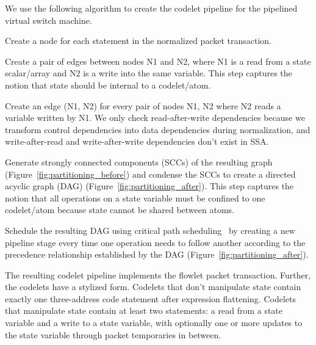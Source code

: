 We use the following algorithm to create the codelet pipeline for the pipelined
virtual switch machine.
\begin{CompactEnumerate}
  \item Create a node for each statement in the normalized packet transaction.
  \item Create a pair of edges between nodes N1 and N2, where N1 is a read from
    a state scalar/array and N2 is a write into the same variable.  This step
    captures the notion that state should be internal to a codelet/atom.
  \item Create an edge (N1, N2) for every pair of nodes N1, N2 where N2 reads a
    variable written by N1. We only check read-after-write dependencies because
    we transform control dependencies into data dependencies during normalization,
    and write-after-read and write-after-write dependencies don't
    exist in SSA.
  \item Generate strongly connected components (SCCs) of the resulting graph
    (Figure~\ref{fig:partitioning_before}) and condense the SCCs to create a
    directed acyclic graph (DAG) (Figure~\ref{fig:partitioning_after}). This
    step captures the notion that all operations on a state variable must be
    confined to one codelet/atom because state cannot be shared between atoms.
  \item Schedule the resulting DAG using critical path
    scheduling~\cite{crit_path_sched} by creating a new pipeline stage every time
    one operation needs to follow another according to the precedence relationship
    established by the DAG (Figure~\ref{fig:partitioning_after}).
\end{CompactEnumerate}


The resulting codelet pipeline implements the flowlet packet transaction.
Further, the codelets have a stylized form.  Codelets that don't manipulate
state contain exactly one three-address code statement after expression
flattening. Codelets that manipulate state contain at least two statements: a
read from a state variable and a write to a state variable, with optionally one
or more updates to the state variable through packet temporaries in between.

